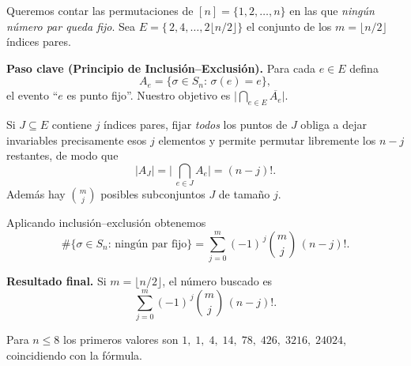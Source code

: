 \begin{solucion}
    Queremos contar las permutaciones de $[n]=\{1,2,\dots,n\}$ en las que
\emph{ningún número par queda fijo}.  
Sea $E=\{\,2,4,\dots,2\lfloor n/2\rfloor\}$ el conjunto de los $m=\lfloor n/2\rfloor$
índices pares.

\textbf{Paso clave (Principio de Inclusión–Exclusión).}  
Para cada $e\in E$ defina 
\[
A_e=\{\sigma\in S_n:\,\sigma(e)=e\},
\]
el evento “$e$ es punto fijo”.
Nuestro objetivo es 
\(\bigl|\bigcap_{e\in E}\overline{A_e}\bigr|\).

Si $J\subseteq E$ contiene $j$ índices pares, fijar \emph{todos} los puntos de $J$
obliga a dejar invariables precisamente esos $j$ elementos y
permite permutar libremente los $n-j$ restantes, de modo que  
\[
|A_J|=\bigl|\,\bigcap_{e\in J}A_e\bigr|=(n-j)! .
\]
Además hay $\binom{m}{j}$ posibles subconjuntos $J$ de tamaño $j$.

Aplicando inclusión–exclusión obtenemos
\[
\#\{\sigma\in S_n:\, \text{ningún par fijo}\}
=\sum_{j=0}^{m}(-1)^{\,j}\binom{m}{j}\,(n-j)!.
\]

\textbf{Resultado final.}\quad
Si $m=\lfloor n/2\rfloor$, el número buscado es
\[
\boxed{\displaystyle
\sum_{j=0}^{m}(-1)^{\,j}\binom{m}{j}\,(n-j)!
}.
\]

Para $n\le 8$ los primeros valores son  
\(
1,\;1,\;4,\;14,\;78,\;426,\;3216,\;24024
\),
coincidiendo con la fórmula.
\end{solucion}\bigskip
